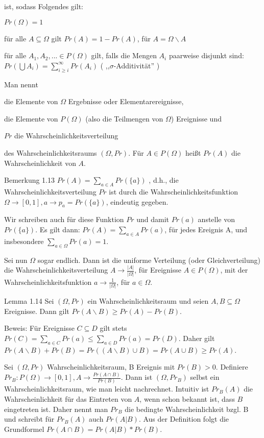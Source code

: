 \documentclass[a4paper]{article}
\begin{document}
\begin{multicols}{3}
    ist, sodass Folgendes gilt:
    \begin{enumerate*}
        \item $Pr(\Omega) = 1$
        \item  für alle $A\subseteq\Omega$ gilt $Pr(A)=1-Pr(A)$, für $A=\Omega\backslash A$
        \item für alle $A_1,A_2,...\in P(\Omega)$ gilt, falls die Mengen $A_i$ paarweise disjunkt sind: $Pr(\bigcup A_i)=\sum_{i\geq i}^{\infty} Pr(A_i)$ ( ,,$\sigma$-Additivität'' )
    \end{enumerate*}

    Man nennt
    \begin{itemize*}
        \item die Elemente von $\Omega$ Ergebnisse oder Elementarereignisse,
        \item die Elemente von $P(\Omega)$ (also die Teilmengen von $\Omega$) Ereignisse und
        \item $Pr$ die Wahrscheinlichkeitsverteilung
    \end{itemize*}

    des Wahrscheinlichkeitsraums $(\Omega,Pr)$. Für $A\in P(\Omega)$ heißt $Pr(A)$ die Wahrscheinlichkeit von $A$.

    Bemerkung 1.13 $Pr(A) =\sum_{a\in A} Pr(\{a\})$ , d.h., die Wahrscheinlichkeitsverteilung $Pr$ ist durch die Wahrscheinlichkeitsfunktion $\Omega\rightarrow[0,1],a \rightarrow p_a= Pr(\{a\})$, eindeutig gegeben.

    Wir schreiben auch für diese Funktion $Pr$ und damit $Pr(a)$ anstelle von $Pr(\{a\})$. Es gilt dann: $Pr(A)=\sum_{a\in A} Pr(a)$, für jedes Ereignis A, und insbesondere $\sum_{a\in\Omega}Pr(a) = 1$.

    Sei nun $\Omega$ sogar endlich. Dann ist die uniforme Verteilung (oder Gleichverteilung) die  Wahrscheinlichkeitsverteilung $A\rightarrow\frac{|A|}{|\Omega|}$, für Ereignisse $A\in P(\Omega)$, mit der Wahrscheinlichkeitsfunktion $a\rightarrow \frac{1}{|\Omega|}$, für $a\in\Omega$.

    Lemma 1.14 Sei $(\Omega,Pr)$ ein Wahrscheinlichkeitsraum und seien $A,B\subseteq\Omega$ Ereignisse. Dann gilt $Pr(A\backslash B)\geq Pr(A)-Pr(B)$.

    Beweis: Für Ereignisse $C\subseteq D$ gilt stets $Pr(C)=\sum_{a\in C} Pr(a)\leq \sum_{a\in D} Pr(a) = Pr(D)$.
    Daher gilt $Pr(A\backslash B) + Pr(B) = Pr((A\backslash B)\cup B) = Pr(A\cup B)\geq Pr(A)$.

    Sei $(\Omega,Pr)$ Wahrscheinlichkeitsraum, B Ereignis mit $Pr(B)> 0$. Definiere $Pr_B:P(\Omega)\rightarrow[0,1],A \rightarrow\frac{Pr(A\cap B)}{Pr(B)}$.
    Dann ist $(\Omega,Pr_B)$ selbst ein Wahrscheinlichkeitsraum, wie man leicht nachrechnet. Intuitiv ist $Pr_B(A)$ die Wahrscheinlichkeit für das Eintreten von $A$, wenn schon bekannt ist, dass $B$ eingetreten ist. Daher nennt man $Pr_B$ die bedingte Wahrscheinlichkeit bzgl. B und schreibt für $Pr_B(A)$ auch $Pr(A|B)$. Aus der Definition folgt die Grundformel $Pr(A\cap B) = Pr(A|B)*Pr(B)$.


\end{multicols}
\end{document}
